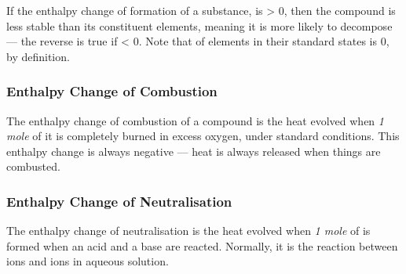 
			If the enthalpy change of formation of a substance,  is > 0, then the compound is less stable than its constituent elements,
			meaning it is more likely to decompose –– the reverse is true if  < 0. Note that  of elements in their standard
			states is 0, by definition.


		\subsubsection{Enthalpy Change of Combustion}
			The enthalpy change of combustion of a compound is the heat evolved when \emph{1 mole} of it is completely burned in excess
			oxygen, under standard conditions. This enthalpy change is always negative –– heat is always released when things are combusted.



		\subsubsection{Enthalpy Change of Neutralisation}

			The enthalpy change of neutralisation is the heat evolved when \emph{1 mole} of  is formed when an acid and a base are
			reacted. Normally, it is the reaction between  ions and  ions in aqueous solution.



